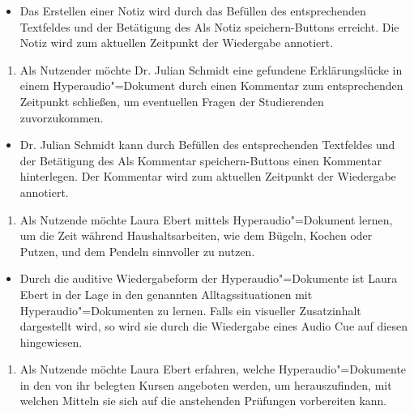 \begin{itemize}[resume*]
\item[\Checkmark]
Das Erstellen einer Notiz wird durch das Befüllen des entsprechenden Textfeldes und der Betätigung des \glqq Als Notiz speichern\grqq{}-Buttons erreicht. Die Notiz wird zum aktuellen Zeitpunkt der Wiedergabe annotiert.
\end{itemize}
\vspace{0.25cm}
\begin{enumerate}[resume*]
\item \label{US-Kommentar-L-Eval} Als Nutzender möchte Dr. Julian Schmidt eine gefundene Erklärungslücke in einem Hyperaudio"=Dokument durch einen Kommentar zum entsprechenden Zeitpunkt schließen, um eventuellen Fragen der Studierenden zuvorzukommen.
\end{enumerate}
\begin{itemize}[resume*]
\item[\Checkmark]
Dr. Julian Schmidt kann durch Befüllen des entsprechenden Textfeldes und der Betätigung des \glqq Als Kommentar speichern\grqq{}-Buttons einen Kommentar hinterlegen. Der Kommentar wird zum aktuellen Zeitpunkt der Wiedergabe annotiert.
\end{itemize}
\vspace{0.25cm}
\begin{enumerate}[resume*]
\item \label{US-Zeit-Eval} Als Nutzende möchte Laura Ebert mittels Hyperaudio"=Dokument lernen, um die Zeit während Haushaltsarbeiten, wie dem Bügeln, Kochen oder Putzen, und dem Pendeln sinnvoller zu nutzen.
\end{enumerate}
\begin{itemize}[resume*]
\item[\Checkmark]
Durch die auditive Wiedergabeform der Hyperaudio"=Dokumente ist Laura Ebert in der Lage in den genannten Alltagssituationen mit Hyperaudio"=Dokumenten zu lernen. Falls ein visueller Zusatzinhalt dargestellt wird, so wird sie durch die Wiedergabe eines Audio Cue auf diesen hingewiesen.
\end{itemize}
\vspace{0.25cm}
\begin{enumerate}[resume*]
\item \label{US-Uebersicht-Kurse-Eval} Als Nutzende möchte Laura Ebert erfahren, welche Hyperaudio"=Dokumente in den von ihr belegten Kursen angeboten werden, um herauszufinden, mit welchen Mitteln sie sich auf die anstehenden Prüfungen vorbereiten kann.
\end{enumerate}
